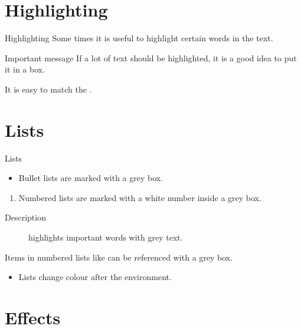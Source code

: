 \documentclass[english,MathSerif,aspectratio=169]{beamer}
\begin{document}
\section{Highlighting}
\SectionPage


\begin{frame}{Highlighting}
    Some times it is useful to \alert{highlight} certain words in the text.

    \begin{alertblock}{Important message}
        If a lot of text should be \alert{highlighted}, it is a good idea to put it in a box.
    \end{alertblock}

    It is easy to match the .
\end{frame}


\section{Lists}


\begin{frame}{Lists}
    \begin{itemize}
        \item
        Bullet lists are marked with a grey box.
    \end{itemize}

    \begin{enumerate}
        \item
        \label{enum:item}
        Numbered lists are marked with a white number inside a grey box.
    \end{enumerate}

    \begin{description}
        \item[Description]
        highlights important words with grey text.
    \end{description}

    Items in numbered lists like  can be referenced with a grey box.

    \begin{example}
        \begin{itemize}
            \item
            Lists change colour after the environment.
        \end{itemize}
    \end{example}
\end{frame}


\section{Effects}
\end{document}
